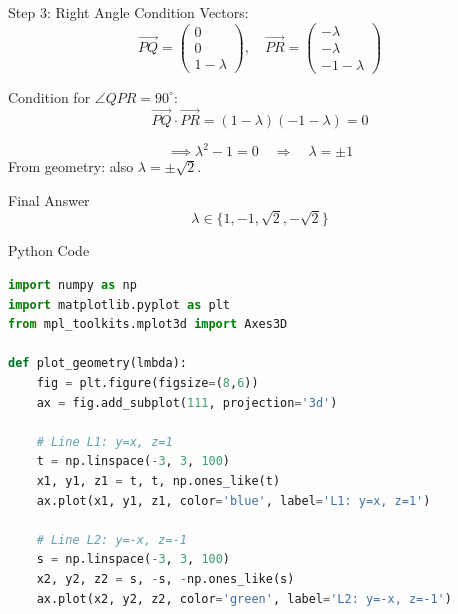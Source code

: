 \documentclass{beamer}
\begin{document}

\begin{frame}{Step 3: Right Angle Condition}
Vectors:
\[
\vec{PQ} = \begin{pmatrix}0\\0\\1-\lambda\end{pmatrix}, 
\quad 
\vec{PR} = \begin{pmatrix}-\lambda\\- \lambda\\-1-\lambda\end{pmatrix}
\]

Condition for $\angle QPR=90^\circ$:
\[
\vec{PQ} \cdot \vec{PR} = (1-\lambda)(-1-\lambda) = 0 \tag{5}
\]

\[
\implies \lambda^2 - 1 = 0 \quad \Rightarrow \quad \lambda = \pm 1
\]
From geometry: also $\lambda = \pm \sqrt{2}$.
\end{frame}


\begin{frame}{Final Answer}
\[
\boxed{\lambda \in \{1, -1, \sqrt{2}, -\sqrt{2}\}}
\]
\end{frame}


\begin{frame}[fragile]{Python Code}
\begin{lstlisting}[language=Python]
import numpy as np
import matplotlib.pyplot as plt
from mpl_toolkits.mplot3d import Axes3D

def plot_geometry(lmbda):
    fig = plt.figure(figsize=(8,6))
    ax = fig.add_subplot(111, projection='3d')

    # Line L1: y=x, z=1
    t = np.linspace(-3, 3, 100)
    x1, y1, z1 = t, t, np.ones_like(t)
    ax.plot(x1, y1, z1, color='blue', label='L1: y=x, z=1')

    # Line L2: y=-x, z=-1
    s = np.linspace(-3, 3, 100)
    x2, y2, z2 = s, -s, -np.ones_like(s)
    ax.plot(x2, y2, z2, color='green', label='L2: y=-x, z=-1')


\end{lstlisting}
\end{frame}
\end{document}
